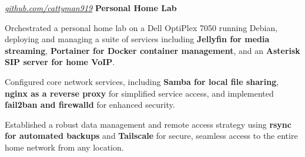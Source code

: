 \documentclass[../main.tex]{subfiles}
\begin{document}
\vspace{0.2 cm}

\begin{twocolentry}{
    \small
    \textit{\href{https://github.com/cattyman919/}{github.com/cattyman919}}
}
    \textbf{Personal Home Lab}
\end{twocolentry}

\vspace{0.10 cm}
\begin{onecolentry}
\begin{highlights}
    \item Orchestrated a personal home lab on a Dell OptiPlex 7050 running Debian, deploying and managing a suite of services including \textbf{Jellyfin for media streaming}, \textbf{Portainer for Docker container management}, and an \textbf{Asterisk SIP server for home VoIP}.
    \item Configured core network services, including \textbf{Samba for local file sharing}, \textbf{nginx as a reverse proxy} for simplified service access, and implemented \textbf{fail2ban and firewalld} for enhanced security.
    \item Established a robust data management and remote access strategy using \textbf{rsync for automated backups} and \textbf{Tailscale} for secure, seamless access to the entire home network from any location.
\end{highlights}
\end{onecolentry}
\end{document}
